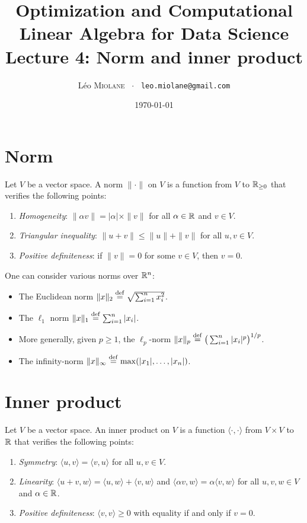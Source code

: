 \documentclass[11pt,nocut]{article}
\title{\vspace{-2.0cm}%
	Optimization and Computational Linear Algebra for Data Science\\
Lecture 4: Norm and inner product}
\author{Léo \textsc{Miolane} \ $\cdot$ \ \texttt{leo.miolane@gmail.com}}
\date{\today}
\begin{document}
\maketitle


\section{Norm}

\begin{definition}[Norm]
	Let $V$ be a vector space.
	A norm $\| \cdot \|$ on $V$ is a function from $V$ to $\mathbb{R}_{\geq 0}$ that verifies the following points:
	\begin{enumerate}[label=(\roman*)]
		\item \emph{Homogeneity}: $\| \alpha v \| = |\alpha|\times \| v\|$ for all $\alpha \in \mathbb{R}$ and  $v \in V$.
		\item \emph{Triangular inequality}: $\|u + v\| \leq \|u\| + \|v\|$ for all $u,v \in V$.
		\item \emph{Positive definiteness}: if $\|v\| = 0$ for some $v \in V$, then $v=0$.
	\end{enumerate}
\end{definition}

\begin{example}
	One can consider various norms over $\mathbb{R}^n$:
	\begin{itemize}
		\item The Euclidean norm $\|x\|_2 \overset{\rm def}{=} \sqrt{\sum_{i=1}^n x_i^2}$.
		\item The $\ell_1$ norm $\|x\|_1 \overset{\rm def}{=} \sum_{i=1}^n |x_i|$.
		\item More generally, given $p \geq 1$, the $\ell_p$-norm $\|x\|_p \overset{\rm def}{=} \big(\sum_{i=1}^n |x_i|^p \big)^{1/p}$.
		\item The infinity-norm $\|x \|_{\infty} \overset{\rm def}{=} \max(|x_1|, \dots, |x_n|)$.
	\end{itemize}
\end{example}


\section{Inner product}

\begin{definition}
	Let $V$ be a vector space.
	An inner product on $V$ is a function $\langle \cdot, \cdot \rangle$ from $V \times V$ to $\mathbb{R}$ that verifies the following points:
	\begin{enumerate}[label=(\roman*)]
		\item \emph{Symmetry}: $\langle u, v \rangle = \langle v, u\rangle$ for all $u,v \in V$.
		\item \emph{Linearity}: $\langle u+v, w \rangle = \langle u, w\rangle + \langle v, w\rangle$ and $\langle \alpha v, w \rangle = \alpha \langle v, w \rangle$ for all $u,v,w \in V$ and $\alpha \in \mathbb{R}$.
		\item \emph{Positive definiteness}: $\langle v, v\rangle \geq 0$ with equality if and only if $v = 0$.
	\end{enumerate}
\end{definition}
\end{document}
